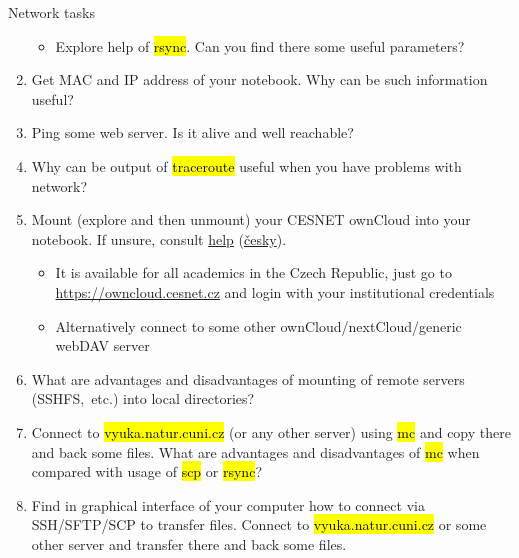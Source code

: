 \documentclass[compress, ucs, xelatex, 11pt, xcolor=svgnames, aspectratio=169,
	hyperref={
		bookmarks=true,
		unicode=true,
		colorlinks=true,
		pdftitle={Linux, command line and MetaCentrum},
		plainpages=false,
		pdfauthor={Vojtech Zeisek},
		pdfsubject={Course about use of Linux command line, writing shell scripts and using MetaCentrum of CESNET},
		pdfcreator={XeLaTeX},
		pdfkeywords={Linux, GNU, BASH, shell, command line, MetaCentrum},
		linkcolor=DarkRed, %
		anchorcolor=DarkBlue, %
		citecolor=Indigo, %
		filecolor=NavyBlue, %
		menucolor=DarkMagenta, %
		urlcolor=DarkBlue, %
		pdftex},
	url={hyphens, lowtilde} %
	]{beamer}
\renewcommand{\texttt}[1]{\hl{\ttfamily #1}}
\begin{document}
\begin{frame}[allowframebreaks]{Network tasks}
\begin{enumerate}
\begin{itemize}
			\item Explore help of \texttt{rsync}. Can you find there some useful parameters?
		\end{itemize}
		\item Get MAC and IP address of your notebook. Why can be such information useful?
		\item Ping some web server. Is it alive and well reachable?
		\item Why can be output of \texttt{traceroute} useful when you have problems with network?
		\item Mount (explore and then unmount) your CESNET ownCloud into your notebook. If unsure, consult \href{https://du.cesnet.cz/en/navody/owncloud/start}{help} (\href{https://du.cesnet.cz/cs/navody/owncloud/start}{česky}).
		\begin{itemize}
			\item It is available for all academics in the Czech Republic, just go to \url{https://owncloud.cesnet.cz} and login with your institutional credentials
			\item Alternatively connect to some other ownCloud/nextCloud/generic webDAV server
		\end{itemize}
		\item What are advantages and disadvantages of mounting of remote servers (SSHFS,~etc.) into local directories?
		\item Connect to \texttt{vyuka.natur.cuni.cz} (or any other server) using \texttt{mc} and copy there and back some files. What are advantages and disadvantages of \texttt{mc} when compared with usage of \texttt{scp} or \texttt{rsync}?
		\item Find in graphical interface of your computer how to connect via SSH/SFTP/SCP to transfer files. Connect to \texttt{vyuka.natur.cuni.cz} or some other server and transfer there and back some files.
	\end{enumerate}
\end{frame}
\end{document}
